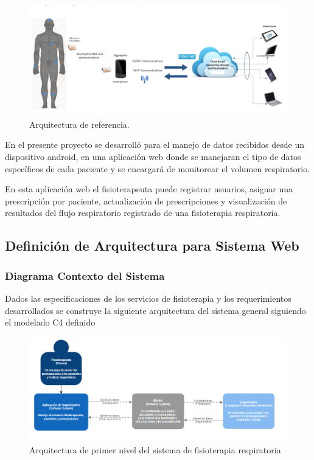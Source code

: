 \documentclass[12pt]{article}
\begin{document}
\begin{figure}[ht]
\centering
\includegraphics[scale=0.4]{imag/ArquitecturaREF.png}
\caption{Arquitectura de referencia. } %
\label{3}
\end{figure}
\FloatBarrier

En el presente proyecto se desarrolló para el manejo de datos recibidos desde un dispositivo android, en una aplicación web donde se manejaran el tipo de datos específicos de cada paciente y se encargará de monitorear el volumen respiratorio.

En esta aplicación web el fisioterapeuta puede registrar usuarios, asignar una prescripción por paciente, actualización de prescripciones y visualización de resultados del flujo respiratorio registrado de una fisioterapia respiratoria.




\subsection{Definición de Arquitectura para Sistema Web}


\subsubsection{Diagrama Contexto del Sistema}

Dados las especificaciones de los servicios de fisioterapia y los requerimientos desarrollados se construye la siguiente arquitectura del sistema general siguiendo el modelado C4 definido

\begin{figure}[ht]
\centering
\includegraphics[scale=0.6]{imag/L1C4.PNG}
\caption{Arquitectura de primer nivel del sistema de fisioterapia respiratoria}
\label{5}
\end{figure}
\FloatBarrier
\end{document}
